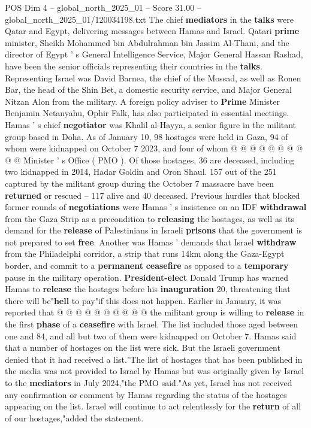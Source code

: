 \begin{textsample}{POS Dim 4 – global\_north\_2025\_01 – Score 31.00 – global\_north\_2025\_01/120034198.txt}
The chief \textbf{mediators} in the \textbf{talks} were Qatar and Egypt, delivering messages between Hamas and Israel.
Qatari \textbf{prime} minister, Sheikh Mohammed bin Abdulrahman bin Jassim Al-Thani, and the director of Egypt ' s General Intelligence Service, Major General Hassan Rashad, have been the senior officials representing their countries in the \textbf{talks}.
Representing Israel was David Barnea, the chief of the Mossad, as well as Ronen Bar, the head of the Shin Bet, a domestic security service, and Major General Nitzan Alon from the military.
A foreign policy adviser to \textbf{Prime} Minister Benjamin Netanyahu, Ophir Falk, has also participated in essential meetings.
Hamas ' s chief \textbf{negotiator} was Khalil al-Hayya, a senior figure in the militant group based in Doha.
As of January 10, 98 hostages were held in Gaza, 94 of whom were kidnapped on October 7 2023, and four of whom @ @ @ @ @ @ @ @ @ @ Minister ' s Office ( PMO ).
Of those hostages, 36 are deceased, including two kidnapped in 2014, Hadar Goldin and Oron Shaul. 157 out of the 251 captured by the militant group during the October 7 massacre have been \textbf{returned} or rescued -- 117 alive and 40 deceased.
Previous hurdles that blocked former rounds of \textbf{negotiations} were Hamas ' s insistence on an IDF \textbf{withdrawal} from the Gaza Strip as a precondition to \textbf{releasing} the hostages, as well as its demand for the \textbf{release} of Palestinians in Israeli \textbf{prisons} that the government is not prepared to set \textbf{free}.
Another was Hamas ' demands that Israel \textbf{withdraw} from the Philadelphi corridor, a strip that runs 14km along the Gaza-Egypt border, and commit to a \textbf{permanent} \textbf{ceasefire} as opposed to a \textbf{temporary} pause in the military operation. \textbf{President-elect} Donald Trump has warned Hamas to \textbf{release} the hostages before his \textbf{inauguration} 20, threatening that there will be"\textbf{hell} to pay"if this does not happen.
Earlier in January, it was reported that @ @ @ @ @ @ @ @ @ @ the militant group is willing to \textbf{release} in the first \textbf{phase} of a \textbf{ceasefire} with Israel.
The list included those aged between one and 84, and all but two of them were kidnapped on October 7.
Hamas said that a number of hostages on the list were sick.
But the Israeli government denied that it had received a list."The list of hostages that has been published in the media was not provided to Israel by Hamas but was originally given by Israel to the \textbf{mediators} in July 2024,"the PMO said."As yet, Israel has not received any confirmation or comment by Hamas regarding the status of the hostages appearing on the list.
Israel will continue to act relentlessly for the \textbf{return} of all of our hostages,"added the statement.

\end{textsample}
